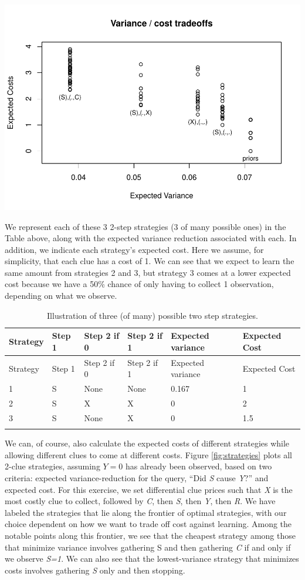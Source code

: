 \documentclass[
  12pt,
]{book}
\begin{document}
\includegraphics{ii_files/figure-latex/runexam-1.pdf}

We represent each of these 3 2-step strategies (3 of many possible ones) in the Table above, along with the expected variance reduction associated with each. In addition, we indicate each strategy's expected cost. Here we assume, for simplicity, that each clue has a cost of 1. We can see that we expect to learn the same amount from strategies 2 and 3, but strategy 3 comes at a lower expected cost because we have a 50\% chance of only having to collect 1 observation, depending on what we observe.

\begin{longtable}[]{@{}llllll@{}}
\caption{Illustration of three (of many) possible two step strategies.}\tabularnewline
\toprule
Strategy & Step 1 & Step 2 if 0 & Step 2 if 1 & Expected variance & Expected Cost \\
\midrule
\endfirsthead
\toprule
Strategy & Step 1 & Step 2 if 0 & Step 2 if 1 & Expected variance & Expected Cost \\
\midrule
\endhead
1 & S & None & None & 0.167 & 1 \\
2 & S & X & X & 0 & 2 \\
3 & S & None & X & 0 & 1.5 \\
& & & & & \\
\bottomrule
\end{longtable}

We can, of course, also calculate the expected costs of different strategies while allowing different clues to come at different costs. Figure \ref{fig:strategies} plots all 2-clue strategies, assuming \(Y=0\) has already been observed, based on two criteria: expected variance-reduction for the query, ``Did \emph{S} cause \emph{Y}?'' and expected cost. For this exercise, we set differential clue prices such that \emph{X} is the most costly clue to collect, followed by \emph{C}, then \emph{S}, then \emph{Y}, then \emph{R}. We have labeled the strategies that lie along the frontier of optimal strategies, with our choice dependent on how we want to trade off cost against learning. Among the notable points along this frontier, we see that the cheapest strategy among those that minimize variance involves gathering S and then gathering \emph{C} if and only if we observe \emph{S=1}. We can also see that the lowest-variance strategy that minimizes costs involves gathering \emph{S} only and then stopping.
\end{document}
